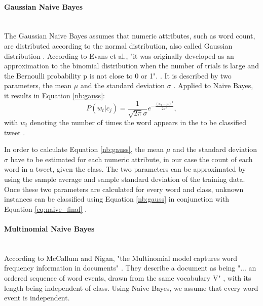         \paragraph{Gaussian Naive Bayes} \mbox{} \\

        The Gaussian Naive Bayes assumes that numeric attributes, such as word count, are distributed according to the normal distribution, also called Gaussian distribution \cite{nb_gauss}. According to Evans et al., "it was originally developed as an approximation to the binomial distribution when the number of trials is large and the Bernoulli probability p is not close to 0 or 1". \cite[p.~143]{evans2011statistical}. It is described by two parameters, the mean $\mu$ and the standard deviation $\sigma$ \cite{evans2011statistical}. Applied to Naive Bayes, it results in Equation \eqref{nb:gauss}:
        \begin{equation}
        \label{nb:gauss}
            P(w_t|c_j) = \frac{1}{\sqrt{2\pi}\sigma}e^{-\frac{(w_t-\mu)^2}{2\sigma^2}},
        \end{equation}
        with $w_t$ denoting the number of times the word appears in the to be classified tweet \cite{nb_gauss}.
        
        In order to calculate Equation \eqref{nb:gauss}, the mean $\mu$ and the standard deviation $\sigma$ have to be estimated for each numeric attribute, in our case the count of each word in a tweet, given the class. The two parameters can be approximated by using the sample average and sample standard deviation of the training data. Once these two parameters are calculated for every word and class, unknown instances can be classified using Equation \eqref{nb:gauss} in conjunction with Equation \eqref{eq:naive_final} \cite{nb_gauss}.
        
        \paragraph{Multinomial Naive Bayes} \mbox{} \\

        According to McCallum and Nigan, "the Multinomial model captures word frequency information in documents" \cite[p.~3]{Mccallum1998}. They describe a document as being "... an ordered sequence of word events, drawn from the same vocabulary V" \cite[p.~3]{Mccallum1998}, with its length being independent of class. Using Naive Bayes, we assume that every word event is independent.
        
